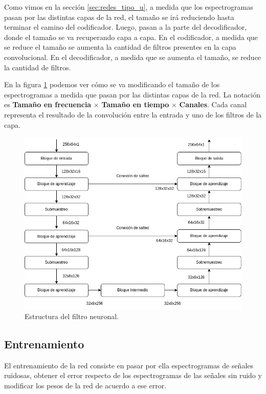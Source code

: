Como vimos en la sección \ref{sec:redes_tipo_u}, a medida que los espectrogramas pasan por las distintas capas de la red, el tamaño se irá reduciendo hasta terminar el camino del codificador. Luego, pasan a la parte del decodificador, donde el tamaño se va recuperando capa a capa. En el codificador, a medida que se reduce el tamaño se aumenta la cantidad de filtros presentes en la capa convolucional. En el decodificador, a medida que se aumenta el tamaño, se reduce la cantidad de filtros.

En la figura \ref{fig:ch7_red_estructura} podemos ver cómo se va modificando el tamaño de los espectrogramas a medida que pasan por las distintas capas de la red. La notación es \textbf{Tamaño en frecuencia} $\times$ \textbf{Tamaño en tiempo} $\times$ \textbf{Canales}. Cada canal representa el resultado de la convolución entre la entrada y uno de los filtros de la capa.

\begin{figure}
	\centering
	\centerline{\includegraphics[scale=0.65]{images/ch7/red_estructura.png}}
	\caption{Estructura del filtro neuronal.}
	\label{fig:ch7_red_estructura}
\end{figure}

\subsection{Entrenamiento}

El entrenamiento de la red consiste en pasar por ella espectrogramas de señales ruidosas, obtener el error respecto de los espectrogramas de las señales sin ruido y modificar los pesos de la red de acuerdo a ese error.

